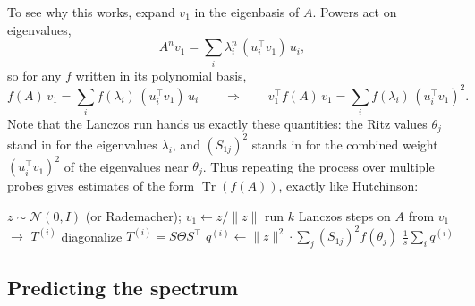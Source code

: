 \documentclass[11pt]{article}
\newtheorem*{remarkbox}{Remark}
\newcommand{\Tr}{\operatorname{Tr}}
\begin{document}
To see why this works, expand $v_1$ in the eigenbasis of $A$. Powers act on eigenvalues,
\[
A^n v_1 = \sum_i \lambda_i^n\, (u_i^\top v_1)\, u_i ,
\]
so for any $f$ written in its polynomial basis,
\[
f(A)\, v_1 = \sum_i f(\lambda_i)\, (u_i^\top v_1)\, u_i
\qquad\Longrightarrow\qquad
v_1^\top f(A)\, v_1 = \sum_i f(\lambda_i)\, (u_i^\top v_1)^2 .
\]
Note that the Lanczos run hands us exactly these quantities: the Ritz values $\theta_j$ stand in for the eigenvalues $\lambda_i$, and $(S_{1j})^2$ stands in for the combined weight $(u_i^\top v_1)^2$ of the eigenvalues near $\theta_j$.
Thus repeating the process over multiple probes gives estimates of the form $\Tr(f(A))$, exactly like Hutchinson:

\begin{algorithmic}[1]
  \State $z \sim \mathcal{N}(0, I)$ (or Rademacher); \quad $v_1 \gets z/\|z\|$
  \State run $k$ Lanczos steps on $A$ from $v_1$ $\to$ $T^{(i)}$ 
  \State diagonalize $T^{(i)} = S \Theta S^\top$
  \State $q^{(i)} \gets \|z\|^2 \cdot \sum_j (S_{1j})^2 f(\theta_j)$
\EndFor
\State \Return $\frac{1}{s} \sum_i q^{(i)}$
\end{algorithmic}

\subsection{Predicting the spectrum}
\end{document}

